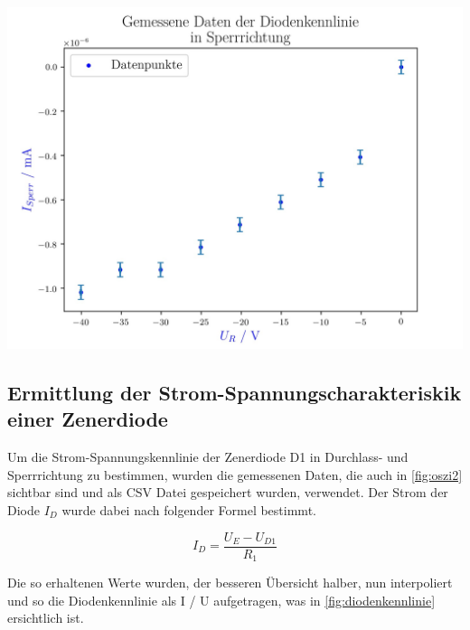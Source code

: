 \documentclass[11pt,ngerman]{scrartcl}
\begin{document}
\begin{center}
	\begin{minipage}[t]{0.8\textwidth}
		\includegraphics[width=\textwidth]{./figures/halbleiter/Versuch1/sperr_error}
		\label{fig:sperrrichtung}
	\end{minipage}
\end{center}

\newpage

\subsection{Ermittlung der Strom-Spannungscharakteriskik einer Zenerdiode}


Um die Strom-Spannungskennlinie der Zenerdiode D1 in Durchlass- und Sperrrichtung zu bestimmen, wurden die gemessenen Daten, die auch in \autoref{fig:oszi2} sichtbar sind und als CSV Datei gespeichert wurden, verwendet. Der Strom der Diode $I_D$ wurde dabei nach folgender Formel bestimmt.

\begin{equation}
	I_D= \frac{U_E-U_{D1}}{R_1}
\end{equation}

Die so erhaltenen Werte wurden, der besseren Übersicht halber, nun interpoliert und so die Diodenkennlinie als I / U aufgetragen, was in  \autoref{fig:diodenkennlinie} ersichtlich ist.
\end{document}

